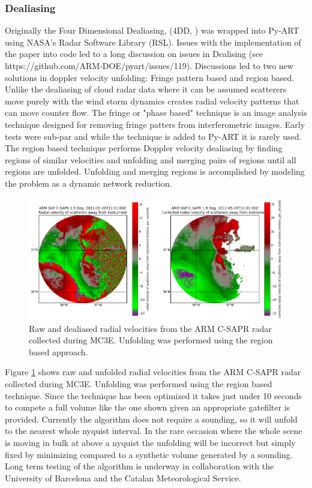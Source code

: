 \documentclass[twocol]{ametsoc}
\begin{document}
\subsubsection{Dealiasing}
Originally the Four Dimensional Dealiasing, (4DD, \cite{james_real-time_2001} ) was wrapped into Py-ART using NASA's Radar Software Library (RSL). Issues with the implementation of the paper into  
code led to a long discussion on issues in Dealising (see https://github.com/ARM-DOE/pyart/issues/119). Discussions led to two new solutions in doppler velocity unfolding: Fringe pattern based and region based. Unlike 
the dealiasing of cloud radar data where it can be assumed scatterers move purely with the wind storm dynamics creates radial velocity patterns that can move counter flow. The fringe or "phase based" technique is an image analysis technique designed for removing fringe patters from interferometric images. Early tests were sub-par and while the technique is added to Py-ART it is rarely used. The region based technique performs Doppler velocity dealiasing by finding regions of similar velocities and unfolding and merging pairs of regions until all regions are unfolded. Unfolding and merging regions is accomplished by modeling the problem as a dynamic network reduction. 
\begin{figure}[h]
    \centering
    \includegraphics[width=0.95\columnwidth]{deal.png}
    \caption{Raw and dealiased radial velocities from the ARM C-SAPR radar collected during MC3E. Unfolding was performed using the region based approach.}
    \label{fig:deal}
\end{figure}
Figure \ref{fig:deal} shows raw and unfolded radial velocities from the ARM C-SAPR radar collected during MC3E. Unfolding was performed using the region based technique. Since the technique has been optimized it takes just under 10 seconds to compete a full volume like the one shown given an appropriate gatefilter is provided. Currently the algorithm does not require a sounding, so it will unfold to the nearest whole nyquist interval. In the rare occasion where the whole scene is moving in bulk at above a nyquist the unfolding will be incorrect but simply fixed by minimizing compared to a synthetic volume generated by a sounding.  Long term testing of the algorithm is underway in collaboration with the University of Barcelona and the Catalan Meteorological Service.  
\end{document}
